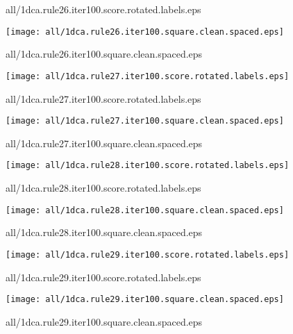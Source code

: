 \documentclass{article}
\begin{document}
{\footnotesize all/1dca.rule26.iter100.score.rotated.labels.eps}
\begin{center}
\begin{minipage}{\textwidth}
\texttt{[image: all/1dca.rule26.iter100.square.clean.spaced.eps]}
\end{minipage}
\end{center}
{\footnotesize all/1dca.rule26.iter100.square.clean.spaced.eps}
\begin{center}
\begin{minipage}{\textwidth}
\texttt{[image: all/1dca.rule27.iter100.score.rotated.labels.eps]}
\end{minipage}
\end{center}
{\footnotesize all/1dca.rule27.iter100.score.rotated.labels.eps}
\begin{center}
\begin{minipage}{\textwidth}
\texttt{[image: all/1dca.rule27.iter100.square.clean.spaced.eps]}
\end{minipage}
\end{center}
{\footnotesize all/1dca.rule27.iter100.square.clean.spaced.eps}
\begin{center}
\begin{minipage}{\textwidth}
\texttt{[image: all/1dca.rule28.iter100.score.rotated.labels.eps]}
\end{minipage}
\end{center}
{\footnotesize all/1dca.rule28.iter100.score.rotated.labels.eps}
\begin{center}
\begin{minipage}{\textwidth}
\texttt{[image: all/1dca.rule28.iter100.square.clean.spaced.eps]}
\end{minipage}
\end{center}
{\footnotesize all/1dca.rule28.iter100.square.clean.spaced.eps}
\begin{center}
\begin{minipage}{\textwidth}
\texttt{[image: all/1dca.rule29.iter100.score.rotated.labels.eps]}
\end{minipage}
\end{center}
{\footnotesize all/1dca.rule29.iter100.score.rotated.labels.eps}
\begin{center}
\begin{minipage}{\textwidth}
\texttt{[image: all/1dca.rule29.iter100.square.clean.spaced.eps]}
\end{minipage}
\end{center}
{\footnotesize all/1dca.rule29.iter100.square.clean.spaced.eps}
\end{document}
